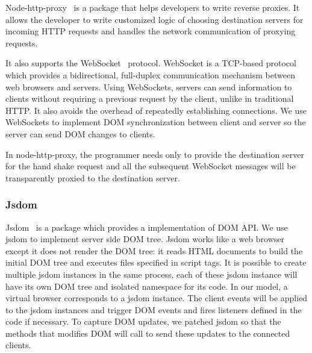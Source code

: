 Node-http-proxy~\cite{nodeproxy} is a \nodejs package that helps developers to 
write reverse proxies.
It allows the developer to write customized logic of choosing destination servers
for incoming HTTP requests and 
handles the network communication of proxying requests.

It also supports the WebSocket~\cite{rfc6455} protocol.
WebSocket is a TCP-based protocol which provides a bidirectional, full-duplex 
communication mechanism between web browsers and servers.
Using WebSockets, servers can send information to clients without requiring
a previous request by the client, unlike in traditional HTTP.
It also avoids the overhead of repeatedly establishing connections.
We use WebSockets to implement DOM synchronization between client and server so
the server can send DOM changes to clients.  

In node-http-proxy,
the programmer needs only to provide the destination server for the hand shake
request and all the subsequent WebSocket messages will
be transparently proxied to the destination server.


\subsubsection{Jsdom}


Jsdom~\cite{JSDOM} is a \nodejs package which provides a \js implementation of 
DOM API. We use jsdom to implement server side DOM tree.
Jsdom works like a web browser except it does not render the DOM tree:
it reads HTML documents to build the initial DOM tree and executes \js files specified in script tags.
It is possible to create multiple jsdom instances in the same process,
each of these jsdom instance will have its own DOM tree and
isolated namespace for its \js code.
In our model, a virtual browser corresponds to a jsdom instance.
The client events will be applied to the jsdom instances and
trigger DOM events and fires listeners defined in the \js code if necessary.
To capture DOM updates, we patched jsdom so that the methods that modifies DOM
will call \cb{} to send these updates to the connected clients.

\section{\cb}

\architectureoverview{}

